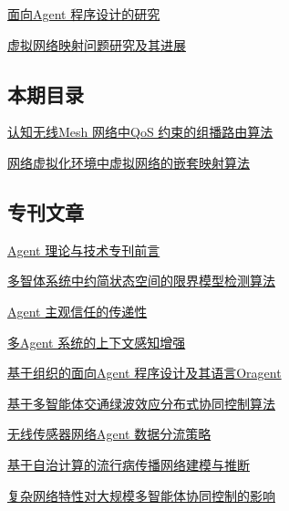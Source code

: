 \documentclass[a4paper]{article}
\begin{document}
\href{http://www.jos.org.cn/ch/reader/download_pdf.aspx?file_no=4297&year_id=2012&quarter_id=11&falg=1}{面向Agent 程序设计的研究}

\href{http://www.jos.org.cn/ch/reader/download_pdf.aspx?file_no=4156&year_id=2012&quarter_id=11&falg=1}{虚拟网络映射问题研究及其进展}

\subsection{本期目录}
\href{http://www.jos.org.cn/ch/reader/download_pdf.aspx?file_no=4210&year_id=2012&quarter_id=11&falg=1}{认知无线Mesh 网络中QoS 约束的组播路由算法}

\href{http://www.jos.org.cn/ch/reader/download_pdf.aspx?file_no=4217&year_id=2012&quarter_id=11&falg=1}{网络虚拟化环境中虚拟网络的嵌套映射算法}

\subsection{专刊文章}
\href{http://www.jos.org.cn/ch/reader/download_pdf.aspx?file_no=4309&year_id=2012&quarter_id=11&falg=1}{Agent 理论与技术专刊前言}

\href{http://www.jos.org.cn/ch/reader/download_pdf.aspx?file_no=4304&year_id=2012&quarter_id=11&falg=1}{多智体系统中约简状态空间的限界模型检测算法}

\href{http://www.jos.org.cn/ch/reader/download_pdf.aspx?file_no=4303&year_id=2012&quarter_id=11&falg=1}{Agent 主观信任的传递性}

\href{http://www.jos.org.cn/ch/reader/download_pdf.aspx?file_no=4301&year_id=2012&quarter_id=11&falg=1}{多Agent 系统的上下文感知增强}

\href{http://www.jos.org.cn/ch/reader/download_pdf.aspx?file_no=4298&year_id=2012&quarter_id=11&falg=1}{基于组织的面向Agent 程序设计及其语言Oragent}

\href{http://www.jos.org.cn/ch/reader/download_pdf.aspx?file_no=4307&year_id=2012&quarter_id=11&falg=1}{基于多智能体交通绿波效应分布式协同控制算法}

\href{http://www.jos.org.cn/ch/reader/download_pdf.aspx?file_no=4306&year_id=2012&quarter_id=11&falg=1}{无线传感器网络Agent 数据分流策略}

\href{http://www.jos.org.cn/ch/reader/download_pdf.aspx?file_no=4300&year_id=2012&quarter_id=11&falg=1}{基于自治计算的流行病传播网络建模与推断}

\href{http://www.jos.org.cn/ch/reader/download_pdf.aspx?file_no=4308&year_id=2012&quarter_id=11&falg=1}{复杂网络特性对大规模多智能体协同控制的影响}
\end{document}

